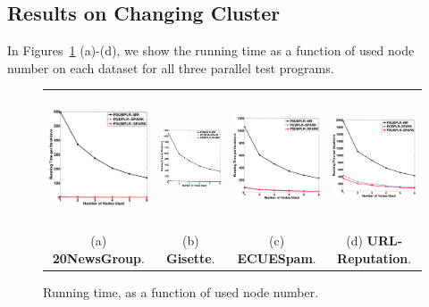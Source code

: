 \documentclass[10pt, conference, compsocconf]{IEEEtran}
\begin{document}
\subsection{Results on Changing Cluster}
In Figures~\ref{fig:time} (a)-(d), we show the running time as a function of used node number on each dataset for all three parallel test programs.
%
\begin{figure}[tb]
\begin{center}
\begin{tabular}{cccc}
   \includegraphics[height=3.9cm,width=4.5cm]{img/20NewsGroup_time.eps}&
   \hspace{-0.6cm}\includegraphics[height=3.9cm,width=4.5cm]{img/Gisette_time.eps}&
   \hspace{-0.6cm}\includegraphics[height=3.9cm,width=4.5cm]{img/ECUESpam_time.eps}&
   \hspace{-0.6cm}\includegraphics[height=3.9cm,width=4.5cm]{img/URL-Reputation_time.eps}\\
   (a) \textbf{20NewsGroup}. & \hspace{-0.3cm}(b) \textbf{Gisette}. & \hspace{-0.3cm}(c) \textbf{ECUESpam}. & \hspace{-0.3cm}(d) \textbf{URL-Reputation}.\\
   \end{tabular}
\end{center}\vspace{-0.3cm}
   \caption{Running time, as a function of used node number.}\vspace{-0.5cm}
\label{fig:time}
\end{figure}
\end{document}
